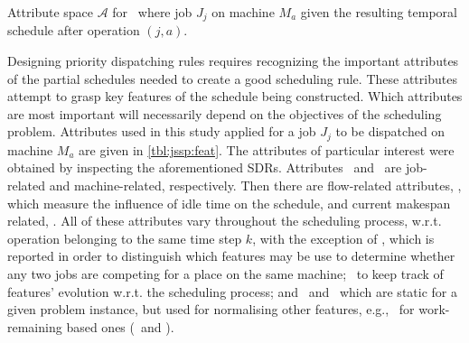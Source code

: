 \documentclass[smallextended]{svjour3}
\begin{document}
\begin{table}[t!] \centering
	\caption[Attribute space $\mathcal{A}$ for \JSP]{Attribute space 
	$\mathcal{A}$ for \JSP~where job $J_j$ on machine $M_a$ given the resulting 
	temporal schedule after operation $(j,a)$.
	}
	\label{tbl:jssp:feat}
	
\end{table}

Designing priority dispatching rules requires recognizing the important 
attributes of the partial schedules needed to create a good scheduling rule. 
These attributes attempt to grasp key features of the schedule being 
constructed. Which attributes are most important will necessarily depend on the
objectives of the scheduling problem. Attributes used in this study applied for 
a job $J_j$ to be dispatched on machine $M_a$ are given in \cref{tbl:jssp:feat}.
The attributes of particular interest were obtained by inspecting the 
aforementioned SDRs. Attributes \phiJobRelated\ and \phiMacRelated\ are 
job-related and machine-related, respectively. 
Then there are flow-related attributes, \phiFlowRelated, which measure the 
influence of idle time on the schedule, and current makespan related, 
\phiScheduleRelated.
All of these attributes vary throughout the scheduling process, w.r.t. 
operation belonging to the same time step $k$, with the exception of \phimac, 
which is reported in order to distinguish which features may be use to determine whether any two jobs are competing for a place on the same machine;
\phistep\ to keep track of features' evolution w.r.t. the scheduling process; 
and \phitotalProc\ and \phiwrmTotal\ which are static for a given problem 
instance, but used for normalising other features, e.g., \phiwrmTotal\ for 
work-remaining based ones (\phiwrmJob\ and \phiwrmMac).

\end{document}
